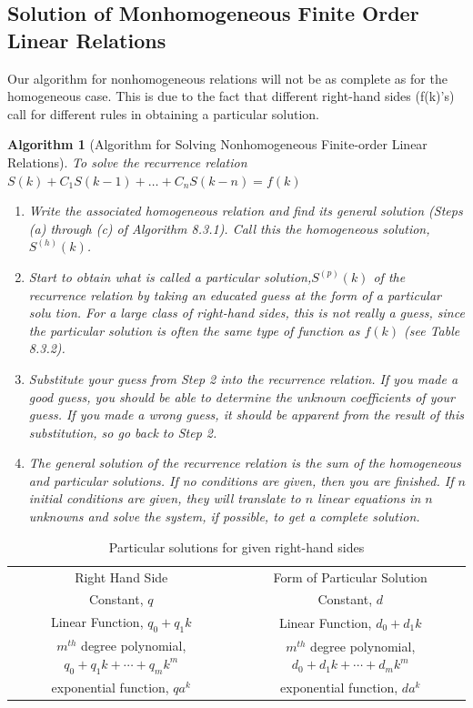 \documentclass[10pt,]{book}
\theoremstyle{plain}
\newtheorem{algorithm}[theorem]{Algorithm}
\theoremstyle{definition}
\theoremstyle{definition}
\theoremstyle{definition}
\theoremstyle{definition}
\numberwithin{equation}{section}
\newcommand{\hrulethick} {\noalign{\hrule height 0.11em}}
\begin{document}
\subsection[Solution of Monhomogeneous Finite Order Linear Relations]{Solution of Monhomogeneous Finite Order Linear Relations}\label{ss-solution-of-nonhomogeneous-relations}
Our algorithm for nonhomogeneous relations will not be as complete as for the homogeneous case. This is due to the fact that different right-hand
sides (f(k)'s) call for different rules in obtaining a particular solution.%
\begin{algorithm}[Algorithm for Solving Nonhomogeneous Finite-order Linear Relations]\label{algorithm-linear-nonhomogeneous-recurrence-relations}
To solve the recurrence relation \(S(k) + C_1S(k - 1) +\ldots + C_n S(k - n) = f(k)\)%
\par
\leavevmode%
\begin{enumerate}[label=\alph*]
\item\hypertarget{li-50}{}Write the associated homogeneous relation and find its general solution (Steps (a) through (c) of Algorithm 8.3.1). Call this the homogeneous
solution, \(S^{(h)}(k)\).%
\item\hypertarget{li-51}{}Start to obtain what is called a particular solution,\(S^{(p)}(k)\) of the recurrence relation by taking an educated guess at the form
of a particular solu tion. For a large class of right-hand sides, this is not really a guess, since the particular solution is often
the same type of function as \(f(k)\) (see Table 8.3.2).%
\item\hypertarget{li-52}{}Substitute your guess from Step 2 into the recurrence relation. If you made a good guess, you should be able to determine the unknown coefficients
of your guess. If you made a wrong guess, it should be apparent from the result of this substitution, so go back to Step 2.%
\item\hypertarget{li-53}{}The general solution of the recurrence relation is the sum of the homogeneous and particular solutions. If no conditions are
given, then you are finished. If \(n\) initial conditions are given, they will translate to \(n\) linear equations in \(n\) unknowns
and solve the system, if possible, to get a complete solution.%
\end{enumerate}
%
\end{algorithm}
\leavevmode%
\begin{table}
\centering
\begin{tabular}{cc}\hrulethick
Right Hand Side&Form of Particular Solution\tabularnewline[0pt]
Constant, \(q\)&Constant, \(d\)\tabularnewline[0pt]
Linear Function, \(q_0+q_1 k\)&Linear Function, \(d_0+d_1 k\)\tabularnewline[0pt]
\(m^{th}\) degree polynomial, \(q_0+q_1k+\cdots +q_m k^m\)&\(m^{th}\) degree polynomial, \(d_0+d_1k+\cdots +d_m k^m\)\tabularnewline[0pt]
exponential function, \(q a^k\)&exponential function, \(d a^k\)
\end{tabular}
\caption{Particular solutions for given right-hand sides\label{tab-particular-sols}}
\end{table}
\end{document}
